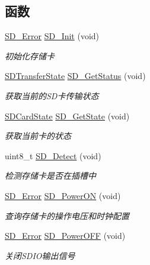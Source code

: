 \subsection*{函数}
\begin{DoxyCompactItemize}
\item 
\hyperlink{group__sd__card_gacff91fa68daa1d1ee967b5b3fb3dbd8c}{S\+D\+\_\+\+Error} \hyperlink{group__sd__card_ga3c927d4d98ffb6f3cc2442b09c19926c}{S\+D\+\_\+\+Init} (void)
\begin{DoxyCompactList}\small\item\em 初始化存储卡 \end{DoxyCompactList}\item 
\hyperlink{group__sd__card_gace0484a459648257c3eae8ea60f64fbf}{S\+D\+Transfer\+State} \hyperlink{group__sd__card_gaf3f228aaee7b2b18acc056b2f27ca3f7}{S\+D\+\_\+\+Get\+Status} (void)
\begin{DoxyCompactList}\small\item\em 获取当前的\+S\+D卡传输状态 \end{DoxyCompactList}\item 
\hyperlink{group__sd__card_gacdc2533a9bff7dc10def0945f5915398}{S\+D\+Card\+State} \hyperlink{group__sd__card_ga1c49d266e4f9ba33b7a425361a30d227}{S\+D\+\_\+\+Get\+State} (void)
\begin{DoxyCompactList}\small\item\em 获取当前卡的状态 \end{DoxyCompactList}\item 
uint8\+\_\+t \hyperlink{group__sd__card_gacb7415873dffa26068c5e46025efebfa}{S\+D\+\_\+\+Detect} (void)
\begin{DoxyCompactList}\small\item\em 检测存储卡是否在插槽中 \end{DoxyCompactList}\item 
\hyperlink{group__sd__card_gacff91fa68daa1d1ee967b5b3fb3dbd8c}{S\+D\+\_\+\+Error} \hyperlink{group__sd__card_ga9fbd4dd6187701cbe286ddb163e9c312}{S\+D\+\_\+\+Power\+ON} (void)
\begin{DoxyCompactList}\small\item\em 查询存储卡的操作电压和时钟配置 \end{DoxyCompactList}\item 
\hyperlink{group__sd__card_gacff91fa68daa1d1ee967b5b3fb3dbd8c}{S\+D\+\_\+\+Error} \hyperlink{group__sd__card_ga9f053c27018521095d7333e7df238764}{S\+D\+\_\+\+Power\+O\+FF} (void)
\begin{DoxyCompactList}\small\item\em 关闭\+S\+D\+I\+O输出信号 \end{DoxyCompactList}\item 

\end{DoxyCompactItemize}
